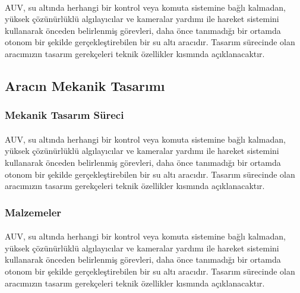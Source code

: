 \documentclass[12pt]{article}
\begin{document}
\begin{justify}
\paragraph{} AUV, su altında herhangi bir kontrol veya komuta sistemine bağlı kalmadan, yüksek çözünürlüklü algılayıcılar ve kameralar yardımı ile hareket sistemini kullanarak önceden belirlenmiş görevleri, daha önce tanımadığı bir ortamda otonom bir şekilde gerçekleştirebilen bir su altı aracıdır. Tasarım sürecinde olan aracımızın tasarım gerekçeleri teknik özellikler kısmında açıklanacaktır.
\end{justify}

\subsection{Aracın Mekanik Tasarımı}

\subsubsection{Mekanik Tasarım Süreci}

\begin{justify}
\paragraph{} AUV, su altında herhangi bir kontrol veya komuta sistemine bağlı kalmadan, yüksek çözünürlüklü algılayıcılar ve kameralar yardımı ile hareket sistemini kullanarak önceden belirlenmiş görevleri, daha önce tanımadığı bir ortamda otonom bir şekilde gerçekleştirebilen bir su altı aracıdır. Tasarım sürecinde olan aracımızın tasarım gerekçeleri teknik özellikler kısmında açıklanacaktır.
\end{justify}

\subsubsection{Malzemeler}

\begin{justify}
\paragraph{} AUV, su altında herhangi bir kontrol veya komuta sistemine bağlı kalmadan, yüksek çözünürlüklü algılayıcılar ve kameralar yardımı ile hareket sistemini kullanarak önceden belirlenmiş görevleri, daha önce tanımadığı bir ortamda otonom bir şekilde gerçekleştirebilen bir su altı aracıdır. Tasarım sürecinde olan aracımızın tasarım gerekçeleri teknik özellikler kısmında açıklanacaktır.
\end{justify}
\end{document}
